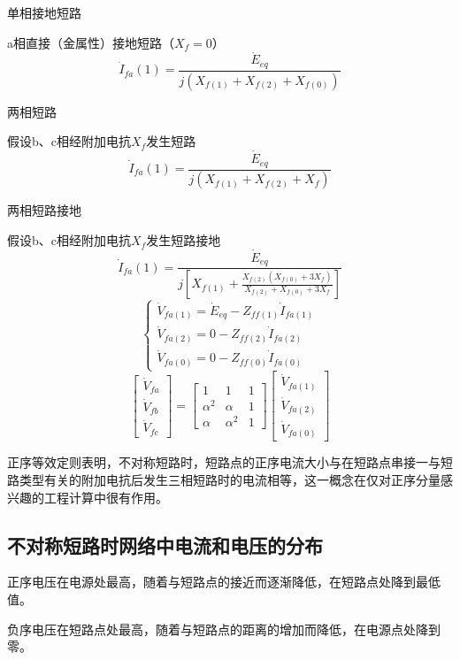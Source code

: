 \documentclass[UTF8, 12pt, a4paper]{ctexart}
\begin{document}
单相接地短路

a相直接（金属性）接地短路（$X_f=0$）
\[ \dot { I } _ { f a } ( 1 ) = \frac {  \dot{E} _ { e q } } { j ( X _ { f ( 1 ) } +  X _ { f ( 2 ) }  + X _{f(0)} )  }\]

两相短路

假设b、c相经附加电抗$X_f$发生短路
\[ \dot { I } _ { f a } ( 1 ) = \frac {  \dot{E} _ { e q } } { j ( X _ { f ( 1 ) } +  X _ { f ( 2 ) }  + X _{f} )  }\]

两相短路接地

假设b、c相经附加电抗$X_f$发生短路接地
\[ \dot { I } _ { f a } ( 1 ) = \frac { \dot{E} _ { e q } } { j [ X _ { f ( 1 ) } +\frac{  X _ { f ( 2 ) } (  X _ { f ( 0 ) } +3 X _f )}{  X _ { f ( 2 ) } +  X _ { f ( 0 ) } +3 X _f} ] }\]
\[
    \begin{cases}
        \dot{V}_{fa(1)}  =  \dot{E}_{eq}-Z_{ff(1)}\dot{I}_{fa(1)}\\
        \dot{V}_{fa(2)}    = 0-Z_{ff(2)}\dot{I}_{fa(2)}\\
        \dot{V}_{fa(0)} =   0-Z_{ff(0)}\dot{I}_{fa(0)}
    \end{cases}
\]
\[
    \begin{bmatrix}
        \dot {V}_{fa}\\
        \dot {V}_{fb} \\
        \dot {V}_{fc}
    \end{bmatrix}=
    \begin{bmatrix}
        1&  1  & 1 \\
        \alpha ^2&\alpha & 1   \\
        \alpha & \alpha ^2& 1
    \end{bmatrix} 
    \begin{bmatrix}
        \dot {V}_{fa(1)}\\
        \dot {V}_{fa(2)}\\
        \dot {V}_{fa(0)}
    \end{bmatrix}
\]

正序等效定则表明，不对称短路时，短路点的正序电流大小与在短路点串接一与短路类型有关的附加电抗后发生三相短路时的电流相等，这一概念在仅对正序分量感兴趣的工程计算中很有作用。
\subsection{不对称短路时网络中电流和电压的分布}
正序电压在电源处最高，随着与短路点的接近而逐渐降低，在短路点处降到最低值。

负序电压在短路点处最高，随着与短路点的距离的增加而降低，在电源点处降到零。
\end{document}
